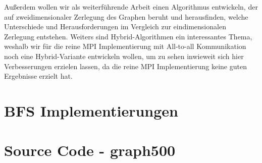 \documentclass[11pt,a4paper]{article}
\begin{document}
Außerdem wollen wir als weiterführende Arbeit einen Algorithmus entwickeln, der auf zweidimensionaler Zerlegung des Graphen beruht und herausfinden, welche Unterschiede und Herausforderungen im Vergleich zur eindimensionalen Zerlegung entstehen. Weiters sind Hybrid-Algorithmen ein interessantes Thema, weshalb wir für die reine MPI Implementierung mit All-to-all Kommunikation noch eine Hybrid-Variante entwickeln wollen, um zu sehen inwieweit sich hier Verbesserungen erzielen lassen, da die reine MPI Implementierung keine guten Ergebnisse erzielt hat.\\
\clearpage


\clearpage
\appendix
\section{BFS Implementierungen}
\label{sec:versions}




\section{Source Code - graph500}
\label{sec:sourcecode}

\clearpage

\clearpage


\clearpage
\end{document}
